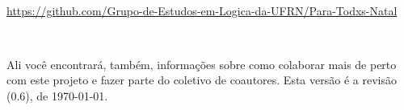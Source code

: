 \

\hbox{{\footnotesize \url{https://github.com/Grupo-de-Estudos-em-Logica-da-UFRN/Para-Todxs-Natal}}} 

\

\noindent Ali você encontrará, também, informações sobre como colaborar mais de perto com este projeto e fazer parte do coletivo de coautores.
Esta versão é a revisão (0.6), de \today.



